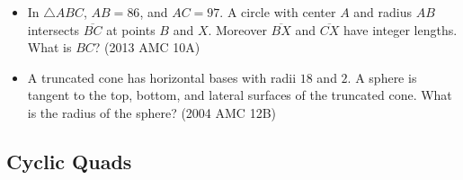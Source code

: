 \documentclass{article}
\begin{document}
\begin{itemize}
\item In $\triangle ABC$, $AB = 86$, and $AC=97$.  A circle with center $A$ and radius $AB$ intersects $\overline{BC}$ at points $B$ and $X$.  Moreover $\overline{BX}$ and $\overline{CX}$ have integer lengths.  What is $BC$? (2013 AMC 10A)


\item A truncated cone has horizontal bases with radii $18$ and $2$. A sphere is tangent to the top, bottom, and lateral surfaces of the truncated cone. What is the radius of the sphere? (2004 AMC 12B)

\end{itemize}


\subsection{Cyclic Quads}
\end{document}
